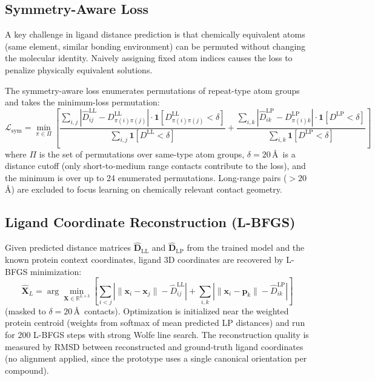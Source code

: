 \documentclass[a4paper,11pt,twoside]{report}
\begin{document}
\subsection{Symmetry-Aware Loss}

A key challenge in ligand distance prediction is that chemically equivalent atoms (same element, similar bonding environment) can be permuted without changing the molecular identity. Naively assigning fixed atom indices causes the loss to penalize physically equivalent solutions.

The symmetry-aware loss enumerates permutations of repeat-type atom groups and takes the minimum-loss permutation:
\begin{equation}
  \mathcal{L}_\text{sym} = \min_{\pi \in \Pi} \left[ \frac{\sum_{i,j}|\hat{D}_{ij}^\text{LL} - D_{\pi(i)\pi(j)}^\text{LL}| \cdot \mathbf{1}[D_{\pi(i)\pi(j)}^\text{LL} < \delta]}{\sum_{i,j}\mathbf{1}[D^\text{LL} < \delta]} + \frac{\sum_{i,k}|\hat{D}_{ik}^\text{LP} - D_{\pi(i)k}^\text{LP}| \cdot \mathbf{1}[D^\text{LP} < \delta]}{\sum_{i,k}\mathbf{1}[D^\text{LP} < \delta]} \right]
\end{equation}
  \label{eq:sym_loss}
where $\Pi$ is the set of permutations over same-type atom groups, $\delta = 20$\,\AA\ is a distance cutoff (only short-to-medium range contacts contribute to the loss), and the minimum is over up to 24 enumerated permutations. Long-range pairs ($> 20$\,\AA) are excluded to focus learning on chemically relevant contact geometry.

\subsection{Ligand Coordinate Reconstruction (L-BFGS)}

Given predicted distance matrices $\hat{\mathbf{D}}_\text{LL}$ and $\hat{\mathbf{D}}_\text{LP}$ from the trained model and the known protein context coordinates, ligand 3D coordinates are recovered by L-BFGS minimization:
\begin{equation}
  \hat{\mathbf{X}}_L = \arg\min_{\mathbf{X} \in \mathbb{R}^{L \times 3}} \left[\sum_{i < j} |\|\mathbf{x}_i - \mathbf{x}_j\| - \hat{D}_{ij}^\text{LL}| + \sum_{i,k} |\|\mathbf{x}_i - \mathbf{p}_k\| - \hat{D}_{ik}^\text{LP}| \right]
\end{equation}
(masked to $\delta = 20$\,\AA\ contacts). Optimization is initialized near the weighted protein centroid (weights from softmax of mean predicted LP distances) and run for 200 L-BFGS steps with strong Wolfe line search. The reconstruction quality is measured by RMSD between reconstructed and ground-truth ligand coordinates (no alignment applied, since the prototype uses a single canonical orientation per compound).
\end{document}
